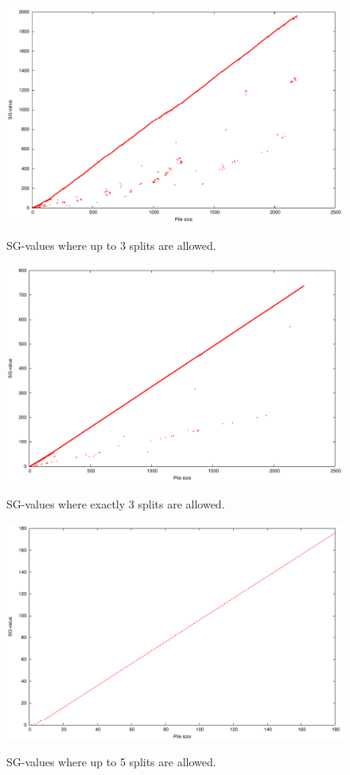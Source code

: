 \documentclass[english,a4paper,twoside]{amsart}
\theoremstyle{lemma}
\begin{document}
\begin{figure}
    \caption{SG-values where up to 3 splits are allowed.}
    \includegraphics[width=\linewidth]{../plots/any3_long.pdf}
    \label{fig:any3_long}
\end{figure}

\begin{figure}
    \caption{SG-values where exactly 3 splits are allowed.}
    \includegraphics[width=\linewidth]{../plots/fixed3_long.pdf}
    \label{fig:fixed3_long}
\end{figure}

\begin{figure}
    \caption{SG-values where up to 5 splits are allowed.}
    \includegraphics[width=\linewidth]{../plots/any6.pdf}
    \label{fig:any5}
\end{figure}
\end{document}
